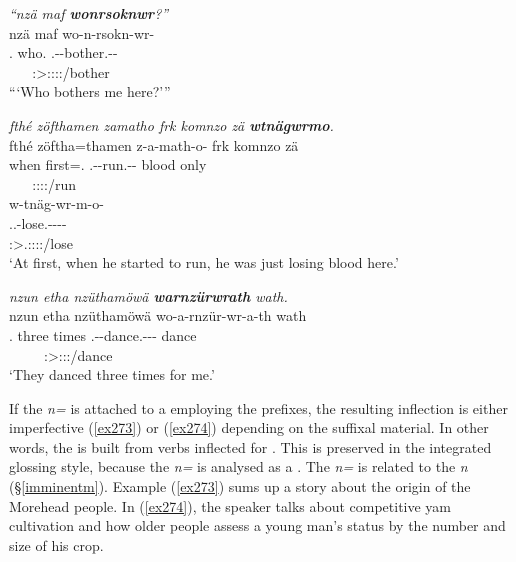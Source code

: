 \begin{exe}
	\ex \emph{``nzä maf \textbf{wonrsoknwr}?''}\\
	\glll nzä maf wo-n-rsokn-wr-\Zero{}\\
	\Fsg.{\Abs} who.{\Erg} \Fsg.\Alph-\Venit-bother.\Ext-\Ndu-\Stsg{}\\
	~ ~ {\footnotesize \Stsg:\Sbj>\Fsg:\Obj:\Nonpast:\Ipfv:\Venit/bother}\\
	\trans ```Who bothers me here?''' 
	\label{ex276}
\end{exe}
\begin{exe}
	\ex \emph{fthé zöfthamen zamatho frk komnzo zä \textbf{wtnägwrmo}.}\\
	\glll fthé zöftha=thamen z-a-math-o-\Zero{} frk komnzo zä\\
	when first=\Temp.{\Loc} \M.\Gam-\Ndu-run.\Rs-\Andat-{\Sg} blood only {\Prox}\\
	~ ~ {\footnotesize \Sg:\Sbj:\Rpst:\Pfv:\Andat/run} ~ ~ ~\\
	\sn
	\glll w-tnäg-wr-m-o-\Zero\\
	\Tsg.\F.\Alph-lose.\Ext-\Ndu-\Dur-\Andat-{\Sg}\\
	{\footnotesize \Sg:\Sbj>\Tsg.\F:\Obj:\Rpst:\Dur:\Andat/lose}\\
	\trans `At first, when he started to run, he was just losing blood here.'\\ 
	\label{ex275}
\end{exe}
\begin{exe}
	\ex \emph{nzun etha nzüthamöwä \textbf{warnzürwrath} wath.}\\
	\glll nzun etha nzüthamöwä wo-a-rnzür-wr-a-th wath\\
	\Fsg.{\Dat} three times \Fsg.\Alph-\Vc-dance.\Ext-\Ndu-\Pst-\Stnsg{} dance\\
	~ ~ ~ {\footnotesize \Stpl:\Sbj>\Fsg:\Io:\Pst:\Ipfv/dance} ~\\
	\trans `They danced three times for me.'
	\label{ex277}
\end{exe}

If the  \emph{n=} is attached to a  employing the \Alph{} prefixes, the resulting inflection is either  imperfective (\ref{ex273}) or   (\ref{ex274}) depending on the suffixal material. In other words, the  is built from verbs inflected for . This is preserved in the integrated glossing style, because the \emph{n=} is analysed as a . The \emph{n=} is related to the   \emph{n} ({\S}\ref{imminentm}). Example (\ref{ex273}) sums up a story about the origin of the Morehead people. In (\ref{ex274}), the speaker talks about competitive yam cultivation and how older people assess a young man's status by the number and size of his crop.

